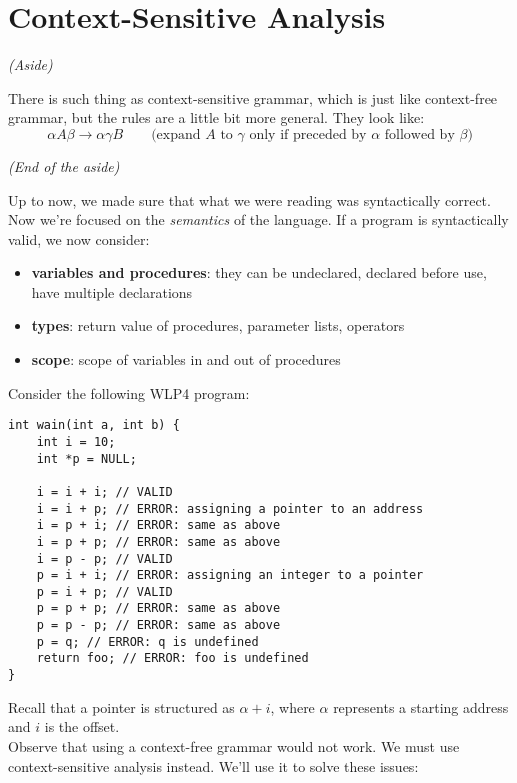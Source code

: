 \documentclass{report}
\begin{document}
\section{Context-Sensitive Analysis}
\begin{center}
\textit{(Aside)}
\end{center} There is such thing as context-sensitive grammar, which is just like context-free grammar, but the rules are a little bit more general. They look like:
$$\alpha A \beta \rightarrow \alpha \gamma B \qquad \text{(expand } A \text{ to } \gamma \text{ only if preceded by } \alpha \text{ followed by } \beta)$$
\begin{center}
\textit{(End of the aside)}
\end{center}
Up to now, we made sure that what we were reading was syntactically correct. Now we're focused on the \textit{semantics} of the language. If a program is syntactically valid, we now consider:
\begin{itemize}
\item \textbf{variables and procedures}: they can be undeclared, declared before use, have multiple declarations
\item \textbf{types}: return value of procedures, parameter lists, operators
\item \textbf{scope}: scope of variables in and out of procedures
\end{itemize}
Consider the following WLP4 program:
\begin{lstlisting}
int wain(int a, int b) {
	int i = 10;
	int *p = NULL;
	
	i = i + i; // VALID
	i = i + p; // ERROR: assigning a pointer to an address
	i = p + i; // ERROR: same as above
	i = p + p; // ERROR: same as above
	i = p - p; // VALID
	p = i + i; // ERROR: assigning an integer to a pointer
	p = i + p; // VALID 
	p = p + p; // ERROR: same as above
	p = p - p; // ERROR: same as above
	p = q; // ERROR: q is undefined
	return foo; // ERROR: foo is undefined
}
\end{lstlisting}
Recall that a pointer is structured as $\alpha + i$, where $\alpha$ represents a starting address and $i$ is the offset.
\\ Observe that using a context-free grammar would not work. We must use context-sensitive analysis instead. We'll use it to solve these issues:
\end{document}
